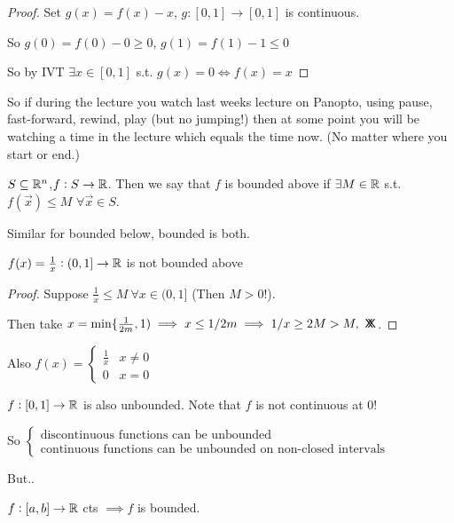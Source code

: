 \begin{proof}
Set $g(x) = f(x) - x$, $g: [0,1] \to [0,1]$ is continuous. 

So $g(0) = f(0) - 0 \geq 0$, $g(1) = f(1) -1 \leq 0$

So by IVT $\exists x\in[0,1]$ s.t. $g(x) = 0\iff f(x) = x$	
\end{proof}

So if during the lecture you watch last weeks lecture on Panopto, using pause, fast-forward, rewind, play (but no jumping!) then at some point you will be watching a time in the lecture which equals the time now. (No matter where you start or end.) \\

\begin{definition}
	$S \subseteq \mathbb{R}^n$,$f: S \to\mathbb{R}$. Then we say that $f$ is bounded above if $\exists M \in\mathbb{R}$ s.t. $f(\vec{x}) \leq M$ $\forall \vec{x} \in S$. 
	
	Similar for bounded below, bounded is both. 
\end{definition}

\begin{example}
$f(x) = \frac{1}{x}: (0,1] \to \mathbb{R}$ is not bounded above

\begin{proof}
Suppose $\frac{1}{x} \leq M~\forall x\in(0,1]$ (Then $M > 0!$).
 
Then take $x = \mathrm{min}\{\frac{1}{2m},1) \implies x \leq 1/2m \implies 1/x \geq 2M > M,~\mathsf{X}\mkern-8.5mu\mathsf{X}$.
\end{proof}	
\end{example}

Also $f(x) = \begin{cases}
 \frac{1}{x} & x\neq 0\\
 0 & x = 0	
 \end{cases}$
 
 $f:[0,1]\to \mathbb{R}$ is also unbounded. Note that $f$ is not continuous at 0!
 
 So $\begin{cases}
	\mbox{discontinuous functions can be unbounded}\\
	\mbox{continuous functions can be unbounded on non-closed intervals}
\end{cases}$

But..

\begin{theorem}
$f:[a,b] \to \mathbb{R}$ cts $\implies f$ is bounded.	
\end{theorem}

